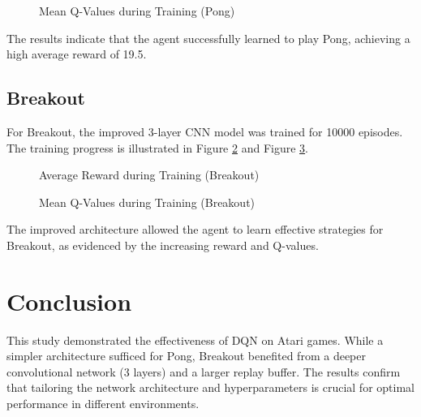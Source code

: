 \documentclass{article}
\begin{document}
\begin{figure}[H]
    \centering
    
    \caption{Mean Q-Values during Training (Pong)}
    \label{fig:pong_qvalues}
\end{figure}

The results indicate that the agent successfully learned to play Pong, achieving a high average reward of 19.5.

\subsection{Breakout}
For Breakout, the improved 3-layer CNN model was trained for 10000 episodes. The training progress is illustrated in Figure \ref{fig:breakout_reward} and Figure \ref{fig:breakout_qvalues}.

\begin{figure}[H]
    \centering
    
    \caption{Average Reward during Training (Breakout)}
    \label{fig:breakout_reward}
\end{figure}

\begin{figure}[H]
    \centering
    
    \caption{Mean Q-Values during Training (Breakout)}
    \label{fig:breakout_qvalues}
\end{figure}

The improved architecture allowed the agent to learn effective strategies for Breakout, as evidenced by the increasing reward and Q-values.

\section{Conclusion}
This study demonstrated the effectiveness of DQN on Atari games. While a simpler architecture sufficed for Pong, Breakout benefited from a deeper convolutional network (3 layers) and a larger replay buffer. The results confirm that tailoring the network architecture and hyperparameters is crucial for optimal performance in different environments.
\end{document}
